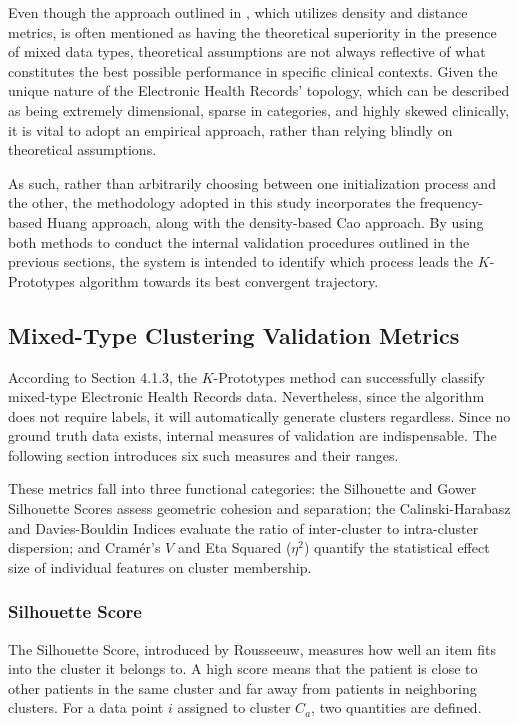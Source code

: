 Even though the approach outlined in \cite{cao2009}, which utilizes density and distance metrics, is often mentioned as having the theoretical superiority in the presence of mixed data types, theoretical assumptions are not always reflective of what constitutes the best possible performance in specific clinical contexts. Given the unique nature of the Electronic Health Records' topology, which can be described as being extremely dimensional, sparse in categories, and highly skewed clinically, it is vital to adopt an empirical approach, rather than relying blindly on theoretical assumptions.

As such, rather than arbitrarily choosing between one initialization process and the other, the methodology adopted in this study incorporates the frequency-based Huang approach, along with the density-based Cao approach. By using both methods to conduct the internal validation procedures outlined in the previous sections, the system is intended to identify which process leads the $K$-Prototypes algorithm towards its best convergent trajectory.
\subsection{Mixed-Type Clustering Validation Metrics}

According to Section 4.1.3, the $K$-Prototypes method can successfully classify mixed-type Electronic Health Records data. Nevertheless, since the algorithm does not require labels, it will automatically generate clusters regardless. Since no ground truth data exists, internal measures of validation are indispensable. The following section introduces six such measures and their ranges.

These metrics fall into three functional categories: the Silhouette and Gower Silhouette Scores assess geometric cohesion and separation; the Calinski-Harabasz and Davies-Bouldin Indices evaluate the ratio of inter-cluster to intra-cluster dispersion; and Cramér's $V$ and Eta Squared ($\eta^2$) quantify the statistical effect size of individual features on cluster membership.

\subsubsection*{Silhouette Score}

The Silhouette Score, introduced by Rousseeuw\cite{rousseeuw1987}, measures how well an item fits into the cluster it belongs to. A high score means that the patient is close to other patients in the same cluster and far away from patients in neighboring clusters. For a data point $i$ assigned to cluster $C_a$, two quantities are defined.

